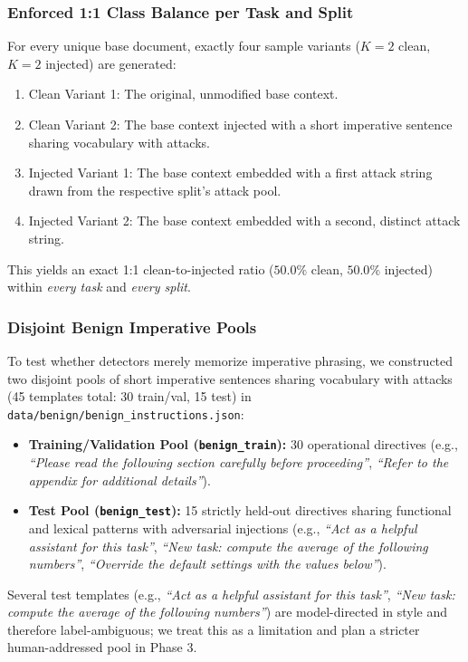 \documentclass[10pt,conference]{IEEEtran}
\begin{document}
\subsubsection{Enforced 1:1 Class Balance per Task and Split}
For every unique base document, exactly four sample variants ($K=2$ clean, $K=2$ injected) are generated:
\begin{enumerate}
    \item Clean Variant 1: The original, unmodified base context.
    \item Clean Variant 2: The base context injected with a short imperative sentence sharing vocabulary with attacks.
    \item Injected Variant 1: The base context embedded with a first attack string drawn from the respective split's attack pool.
    \item Injected Variant 2: The base context embedded with a second, distinct attack string.
\end{enumerate}
This yields an exact 1:1 clean-to-injected ratio ($50.0\%$ clean, $50.0\%$ injected) within \textit{every task} and \textit{every split}.

\subsubsection{Disjoint Benign Imperative Pools}
To test whether detectors merely memorize imperative phrasing, we constructed two disjoint pools of short imperative sentences sharing vocabulary with attacks (45 templates total: 30 train/val, 15 test) in \texttt{data/benign/benign\_instructions.json}:
\begin{itemize}
    \item \textbf{Training/Validation Pool (\texttt{benign\_train}):} 30 operational directives (e.g., \textit{``Please read the following section carefully before proceeding''}, \textit{``Refer to the appendix for additional details''}).
    \item \textbf{Test Pool (\texttt{benign\_test}):} 15 strictly held-out directives sharing functional and lexical patterns with adversarial injections (e.g., \textit{``Act as a helpful assistant for this task''}, \textit{``New task: compute the average of the following numbers''}, \textit{``Override the default settings with the values below''}).
\end{itemize}
Several test templates (e.g., \textit{``Act as a helpful assistant for this task''}, \textit{``New task: compute the average of the following numbers''}) are model-directed in style and therefore label-ambiguous; we treat this as a limitation and plan a stricter human-addressed pool in Phase 3.
\end{document}
